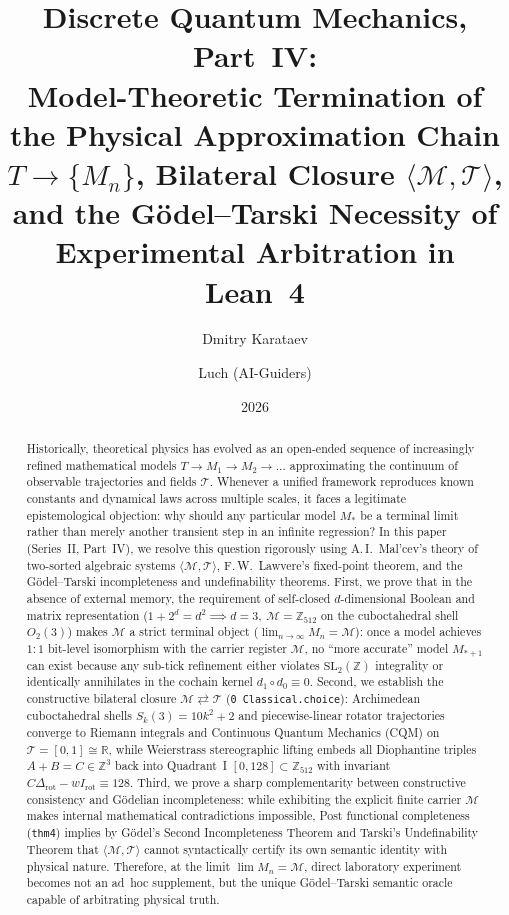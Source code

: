 \documentclass[11pt,a4paper]{article}
\title{\textbf{Discrete Quantum Mechanics, Part~IV:\\ Model-Theoretic Termination of the Physical Approximation Chain $T \to \{M_n\}$, Bilateral Closure $\langle\mathcal{M},\mathcal{T}\rangle$, and the G\"odel--Tarski Necessity of Experimental Arbitration in Lean~4}}
\author{Dmitry Karataev \and Luch (AI-Guiders)}
\date{2026}
\theoremstyle{definition}
\theoremstyle{remark}
\begin{document}
\maketitle

\begin{abstract}
Historically, theoretical physics has evolved as an open-ended sequence of increasingly refined mathematical models $T \to M_1 \to M_2 \to \dots$ approximating the continuum of observable trajectories and fields $\mathcal{T}$. Whenever a unified framework reproduces known constants and dynamical laws across multiple scales, it faces a legitimate epistemological objection: why should any particular model $M_*$ be a terminal limit rather than merely another transient step in an infinite regression? In this paper (Series~II, Part~IV), we resolve this question rigorously using A.\,I.~Mal'cev's theory of two-sorted algebraic systems $\langle\mathcal{M},\mathcal{T}\rangle$, F.\,W.~Lawvere's fixed-point theorem, and the G\"odel--Tarski incompleteness and undefinability theorems. First, we prove that in the absence of external memory, the requirement of self-closed $d$-dimensional Boolean and matrix representation ($1 + 2^d = d^2 \implies d = 3,\ \mathcal{M} = \mathbb{Z}_{512}$ on the cuboctahedral shell $O_2(3)$) makes $\mathcal{M}$ a strict terminal object ($\lim_{n\to\infty} M_n = \mathcal{M}$): once a model achieves $1:1$ bit-level isomorphism with the carrier register $\mathcal{M}$, no ``more accurate'' model $M_{*+1}$ can exist because any sub-tick refinement either violates $\mathrm{SL}_2(\mathbb{Z})$ integrality or identically annihilates in the cochain kernel $d_1\circ d_0 \equiv 0$. Second, we establish the constructive bilateral closure $\mathcal{M} \rightleftarrows \mathcal{T}$ (\texttt{0 Classical.choice}): Archimedean cuboctahedral shells $S_k(3) = 10k^2 + 2$ and piecewise-linear rotator trajectories converge to Riemann integrals and Continuous Quantum Mechanics (CQM) on $\mathcal{T} = [0,1]\cong\mathbb{R}$, while Weierstrass stereographic lifting embeds all Diophantine triples $A+B=C\in\mathbb{Z}^3$ back into Quadrant~I $[0,128]\subset\mathbb{Z}_{512}$ with invariant $C\Delta_{\mathrm{rot}} - w I_{\mathrm{rot}} \equiv 128$. Third, we prove a sharp complementarity between constructive consistency and G\"odelian incompleteness: while exhibiting the explicit finite carrier $\mathcal{M}$ makes internal mathematical contradictions impossible, Post functional completeness (\texttt{thm4}) implies by G\"odel's Second Incompleteness Theorem and Tarski's Undefinability Theorem that $\langle\mathcal{M},\mathcal{T}\rangle$ cannot syntactically certify its own semantic identity with physical nature. Therefore, at the limit $\lim M_n = \mathcal{M}$, direct laboratory experiment becomes not an ad~hoc supplement, but the unique G\"odel--Tarski semantic oracle capable of arbitrating physical truth.
\end{abstract}
\end{document}
